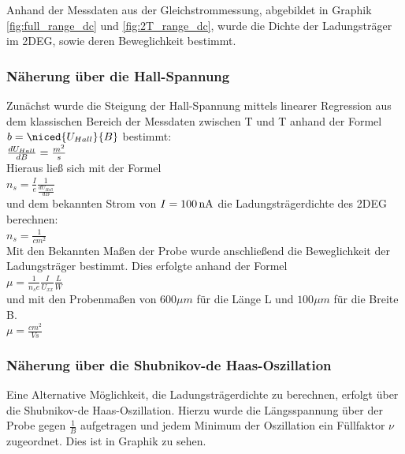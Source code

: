 

Anhand der Messdaten aus der Gleichstrommessung, abgebildet in Graphik \ref{fig:full_range_dc} und \ref{fig:2T_range_dc}, wurde die Dichte der Ladungsträger im 2DEG, sowie deren Beweglichkeit bestimmt.

\subsubsection{Näherung über die Hall-Spannung}
\label{ch:naeherung_hall}

Zunächst wurde die Steigung der Hall-Spannung mittels linearer Regression aus dem klassischen Bereich der Messdaten zwischen \unit[-2]{T} und \unit[2]{T} anhand der Formel $ b=\niced{U_{Hall}}{B} $  
bestimmt: \\

$ \frac{d U_{Hall}}{d B} = \frac{m^2}{s} $  %
\\
Hieraus ließ sich mit der Formel 
\\
$n_s=\frac{I}{e}\frac{1}{\frac{dU_{Hall}}{dB}}$ 
\\
und dem bekannten Strom von $I=\unit[100]{nA}$ die Ladungsträgerdichte des 2DEG berechnen: 
\\
$n_s= \frac{1}{cm^2}$    %
\\
Mit den Bekannten Maßen der Probe wurde anschließend die Beweglichkeit der Ladungsträger bestimmt. Dies erfolgte anhand der Formel \\
$\mu=\frac{1}{n_se}\frac{I}{U_{xx}}\frac{L}{W}$
\\
und mit den Probenmaßen von $600\mu m$ für die Länge L und $100\mu m$  für die Breite B. \\

$\mu= \frac{cm^2}{Vs}$  %

\subsubsection{Näherung über die Shubnikov-de Haas-Oszillation}
\label{ch:naeherung_sdho}

Eine Alternative Möglichkeit, die Ladungsträgerdichte zu berechnen, erfolgt über die Shubnikov-de Haas-Oszillation. Hierzu wurde die Längsspannung über der Probe 
 gegen $\frac{1}{B}$ aufgetragen und jedem Minimum der Oszillation ein Füllfaktor $\nu$ zugeordnet. Dies ist in Graphik %
zu sehen. 

